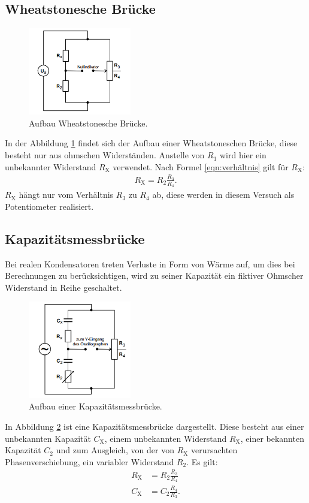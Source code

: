 \subsection{Wheatstonesche Brücke}
\begin{figure}
 \centering
 \includegraphics[width=0.4\textwidth]{wheat.PNG}
 \caption{Aufbau Wheatstonesche Brücke.\cite{sample}}
 \label{fig:wheat}
 \end{figure}
In der Abbildung \ref{fig:wheat} findet sich der Aufbau einer Wheatstoneschen Brücke, diese besteht nur aus ohmschen Widerständen.
Anstelle von $R_\mathrm{1}$ wird hier ein unbekannter Widerstand $R_\mathrm{X}$ verwendet.
Nach Formel \eqref{eqn:verhältnis} gilt für $R_\mathrm{X}$:
\begin{align}
  R_\mathrm{X}=R_\mathrm{2}\frac{R_\mathrm{3}}{R_\mathrm{4}}.\label{eqn:Wheat}
\end{align}
$R_\mathrm{X}$ hängt nur vom Verhältnis $R_\mathrm{3}$ zu $R_\mathrm{4}$ ab, diese werden in diesem Versuch als Potentiometer realisiert.\\
\subsection{Kapazitätsmessbrücke}
Bei realen Kondensatoren treten Verluste in Form von Wärme auf, um dies bei Berechnungen zu berücksichtigen, wird zu seiner Kapazität ein fiktiver Ohmscher Widerstand in Reihe geschaltet.
\begin{figure}
 \centering
 \includegraphics[width=0.4\textwidth]{kapazitaet.PNG}
 \caption{Aufbau einer Kapazitätsmessbrücke.}
 \label{fig:kapazitaet}
 \end{figure}
In Abbildung \ref{fig:kapazitaet} ist eine Kapazitätsmessbrücke dargestellt. Diese besteht aus einer unbekannten Kapazität $C_\mathrm{X}$,
einem unbekannten Widerstand $R_\mathrm{X}$, einer bekannten Kapazität $C_\mathrm{2}$ und zum Ausgleich, von der von $R_\mathrm{X}$ verursachten Phasenverschiebung,
ein variabler Widerstand $R_\mathrm{2}$.
Es gilt:
\begin{align}
  R_\mathrm{X}&=R_\mathrm{2}\frac{R_\mathrm{3}}{R_\mathrm{4}}\label{eqn:CR}\\
  C_\mathrm{X}&=C_\mathrm{2}\frac{R_\mathrm{4}}{R_\mathrm{3}}\label{eqn:CC}.
\end{align}\\
